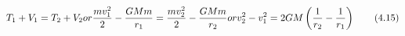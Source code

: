 \begin{equation*}
T_{1} + V_{1} = T_{2} + V_{2} or \newline
\frac{mv_{1}^{2}}{2} - \frac{GMm}{r_{1}} = \frac{mv_{2}^{2}}{2} - \frac{GMm}{r_{2}} or \newline
v_{2}^{2} - v_{1}^{2} = 2GM\left(\frac{1}{r_{2}} - \frac{1}{r_{1}}\right) \tag{4.15}
\end{equation*}
